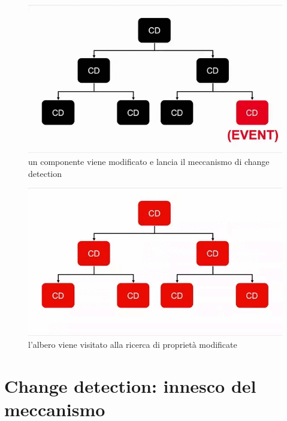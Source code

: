 \begin{figure}[H]
\centering
   \includegraphics[scale=0.5]{resources/cd-1.png}
\caption{un componente viene modificato e lancia il meccanismo di change detection}
\end{figure}
\begin{figure}[H]
\centering
   \includegraphics[scale=0.5]{resources/cd-2.png}
\caption{l'albero viene visitato alla ricerca di proprietà modificate}
\end{figure}





\section{Change detection: innesco del meccanismo}

